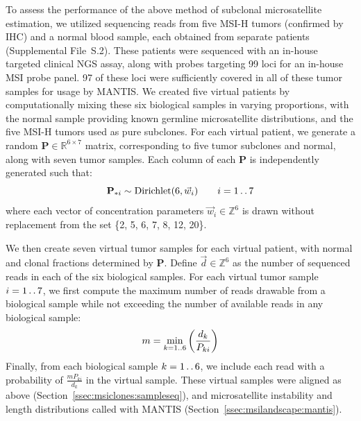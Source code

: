 To assess the performance of the above method of subclonal microsatellite estimation, we utilized sequencing reads from five MSI-H tumors (confirmed by IHC) and a normal blood sample, each obtained from separate patients (Supplemental File~S\thechapter{}.2). These patients were sequenced with an in-house targeted clinical NGS assay, along with probes targeting 99 loci for an in-house MSI probe panel. 97 of these loci were sufficiently covered in all of these tumor samples for usage by MANTIS\@. We created five virtual patients by computationally mixing these six biological samples in varying proportions, with the normal sample providing known germline microsatellite distributions, and the five MSI-H tumors used as pure subclones. For each virtual patient, we generate a random $\mathbf{P} \in \mathbb{R}^{6 \times 7}$ matrix, corresponding to five tumor subclones and normal, along with seven tumor samples. Each column of each $\mathbf{P}$ is independently generated \cite{decamps2020} such that:
\begin{equation}
	\mathbf{P}_{*i} \sim \text{Dirichlet}(6, \vec{w}_i) \qquad i = 1 \mathinner {\ldotp \ldotp} 7
\end{equation}
where each vector of concentration parameters $\vec{w}_i \in \mathbb{Z}^6$ is drawn without replacement from the set \{2, 5, 6, 7, 8, 12, 20\}.

We then create seven virtual tumor samples for each virtual patient, with normal and clonal fractions determined by $\mathbf{P}$. Define $\vec{d} \in \mathbb{Z}^6$ as the number of sequenced reads in each of the six biological samples. For each virtual tumor sample $i = 1 \mathinner {\ldotp \ldotp} 7$, we first compute the maximum number of reads drawable from a biological sample while not exceeding the number of available reads in any biological sample:
\begin{equation*}
	m = \min_{k = 1 \mathinner {\ldotp \ldotp} 6}\left(\frac{d_k}{P_{ki}}\right)
\end{equation*}
Finally, from each biological sample $k = 1 \mathinner {\ldotp \ldotp} 6$, we include each read with a probability of $\frac{m P_{ki}}{d_k}$ in the virtual sample. These virtual samples were aligned as above (Section~\ref{ssec:msiclones:sampleseq}), and microsatellite instability and length distributions called with MANTIS (Section~\ref{ssec:msilandscape:mantis}).


